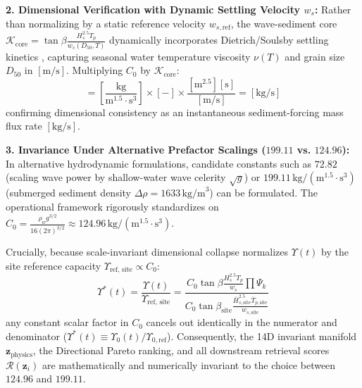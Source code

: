 \documentclass[journal]{IEEEtran}
\begin{document}
\noindent\textbf{2. Dimensional Verification with Dynamic Settling Velocity $w_s$:}
Rather than normalizing by a static reference velocity $w_{s,\text{ref}}$, the wave-sediment core $\mathcal{K}_{\text{core}} = \tan\beta \frac{H_s^{2.5} T_p}{w_s(D_{50}, T)}$ dynamically incorporates Dietrich/Soulsby settling kinetics \cite{dietrich1982settling,soulsby1997dynamics}, capturing seasonal water temperature viscosity $\nu(T)$ and grain size $D_{50}$ in $[\text{m}/\text{s}]$. Multiplying $C_0$ by $\mathcal{K}_{\text{core}}$:
\begin{equation}
[\Upsilon_0] = \left[\frac{\text{kg}}{\text{m}^{1.5}\cdot\text{s}^3}\right] \times [-] \times \frac{[\text{m}^{2.5}][\text{s}]}{[\text{m}/\text{s}]} = [\text{kg}/\text{s}]
\end{equation}
confirming dimensional consistency as an instantaneous sediment-forcing mass flux rate $[\text{kg}/\text{s}]$.

\noindent\textbf{3. Invariance Under Alternative Prefactor Scalings ($199.11$ vs. $124.96$):}
In alternative hydrodynamic formulations, candidate constants such as $72.82$ (scaling wave power by shallow-water wave celerity $\sqrt{g}$) or $199.11\,\text{kg}/(\text{m}^{1.5}\cdot\text{s}^3)$ (submerged sediment density $\Delta\rho = 1633\,\text{kg/m}^3$) can be formulated. The operational framework rigorously standardizes on $C_0 = \frac{\rho_w g^{3/2}}{16(2\pi)^{3/2}} \approx 124.96\,\text{kg}/(\text{m}^{1.5}\cdot\text{s}^3)$.

Crucially, because scale-invariant dimensional collapse normalizes $\Upsilon(t)$ by the site reference capacity $\Upsilon_{\text{ref, site}} \propto C_0$:
\begin{equation}
\Upsilon^*(t) = \frac{\Upsilon(t)}{\Upsilon_{\text{ref, site}}} = \frac{C_0 \tan\beta \frac{H_s^{2.5} T_p}{w_s} \prod \Psi_k}{C_0 \tan\beta_{\text{site}} \frac{\overline{H}_{s,\text{site}}^{2.5} \overline{T}_{p,\text{site}}}{w_{s,\text{site}}}}
\end{equation}
any constant scalar factor in $C_0$ cancels out identically in the numerator and denominator ($\Upsilon^*(t) \equiv \Upsilon_0(t) / \Upsilon_{0,\text{ref}}$). Consequently, the 14D invariant manifold $\mathbf{z}_{\text{physics}}$, the Directional Pareto ranking, and all downstream retrieval scores $\mathcal{R}(\mathbf{z}_i)$ are mathematically and numerically invariant to the choice between $124.96$ and $199.11$.
\end{document}
